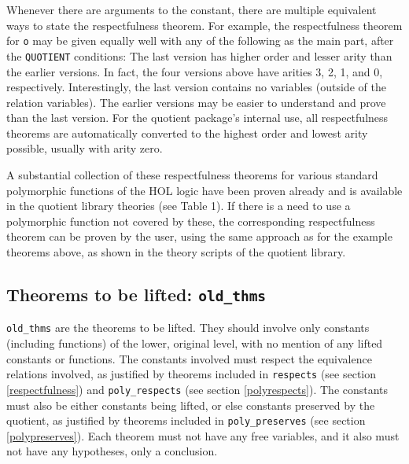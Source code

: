 \documentclass[envcountsame,runningheads]{llncs}
\begin{document}
Whenever there are arguments to the constant, there are
multiple equivalent ways to state the respectfulness theorem.
For example, the respectfulness theorem for {\tt o} may be given
equally well with any of the following as the main part, after the
{\tt QUOTIENT} conditions:
The last version has higher order and lesser arity than the
earlier versions.  In fact, the four versions above have arities
3, 2, 1, and 0, respectively.
Interestingly, the last version contains no variables (outside of the 
relation variables).
The earlier versions may be easier to understand and prove than the
last version.  For the quotient package's internal use, all respectfulness
theorems are automatically converted to the highest order and lowest
arity possible, usually with arity zero.

A substantial collection of these respectfulness theorems for various
standard polymorphic functions of the HOL logic have been proven already and
is available in the quotient library theories (see Table 1).
If there is a need to use a
polymorphic function not covered by these, the corresponding respectfulness
theorem can be proven by the user, using the same approach as for the example
theorems above, as shown in the theory scripts of the quotient library.


%
\subsection{Theorems to be lifted: {\tt old\_thms}}
%
\label{oldtheorem}

{\tt old\_thms} are the theorems to be lifted.  They should involve only
constants (including functions) of the lower, original level,
with no mention of any lifted constants or functions. 
The constants involved must respect
the equivalence relations involved,
as justified by theorems included
in {\tt respects} (see section \ref{respectfulness})
and {\tt poly\_respects} (see section \ref{polyrespects}).
The constants must also be either constants being lifted, or else constants
preserved by the quotient, as justified by theorems included in
{\tt poly\_preserves} (see section \ref{polypreserves}).
Each theorem must not have any free variables, and it also must not
have any hypotheses, only a conclusion.
\end{document}
